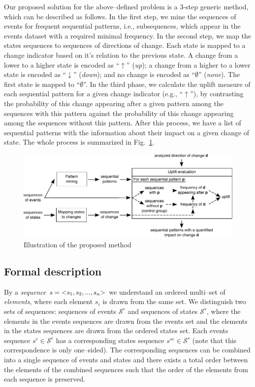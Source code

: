 \documentclass[runningheads,a4paper]{llncs}
\begin{document}
Our proposed solution for the above--defined problem is a 3-step generic method, which can be described as follows.
In the first step, we mine the sequences of events for frequent sequential patterns, i.e., subsequences, which appear in the events dataset with a required minimal frequency.
In the second step, we map the states sequences to sequences of directions of change.
Each state is mapped to a change indicator based on it's relation to the previous state.
A change from a lower to a higher state is encoded as ``$\uparrow$'' (\textit{up}); a change from a higher to a lower state is encoded as ``$\downarrow$'' (\textit{down}); and no change is encoded as ``$\emptyset$'' (\textit{none}).
The first state is mapped to ``$\emptyset$''.
In the third phase, we calculate the uplift measure of each sequential pattern for a given change indicator (e.g., ``$\uparrow$''), by contrasting the probability of this change appearing after a given pattern among the sequences with this pattern against the probability of this change appearing among the sequences without this pattern.
After this process, we have a list of sequential patterns with the information about their impact on a given change of state.
The whole process is summarized in Fig.~\ref{fig:concept}.

\begin{figure}[!ht]
	\centering
		\includegraphics[width=\textwidth]{images/concept}
	\caption{Illustration of the proposed method}
	\label{fig:concept}
\end{figure}

\subsection{Formal description}
By a \textit{sequence} $s=\text{\textless} s_1, s_2, ..., s_n\text{\textgreater}$ we understand an ordered multi--set of \textit{elements}, where each element $s_i$ is drawn from the same set.
We distinguish two sets of sequences: sequences of events $\mathcal{S}^e$ and sequences of states $\mathcal{S}^s$, where the elements in the events sequences are drawn from the events set and the elements in the states sequences are drawn from the ordered states set.
Each events sequence $s^e\in\mathcal{S}^e$ has a corresponding states sequence $s^{se}\in\mathcal{S}^s$ (note that this correspondence is only one--sided).
The corresponding sequences can be combined into a single sequence of events and states and there exists a total order between the elements of the combined sequences such that the order of the elements from each sequence is preserved.
\end{document}
